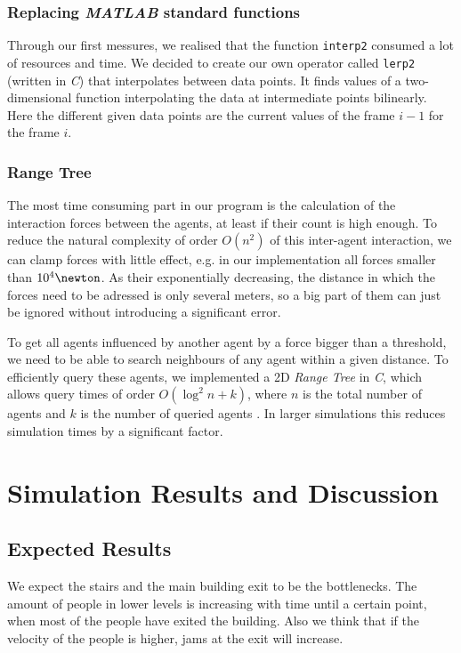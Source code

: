 \documentclass[11pt]{article}
\begin{document}
\subsubsection{Replacing \textit{MATLAB} standard functions}

Through our first messures, we realised that the function \verb+interp2+
consumed a lot of resources and time. We decided to create our own operator
called \verb+lerp2+ (written in \textit{C}) that interpolates between data points. It finds values of a
two-dimensional function interpolating the data at intermediate points bilinearly.
Here the different given data points are the current values of the frame $i-1$
for the frame $i$. 

\subsubsection{Range Tree}
The most time consuming part in our program is the calculation of the interaction
forces between the agents, at least if their count is high enough. To reduce the
natural complexity of order $O(n^{2})$ of this inter-agent interaction, we can clamp forces
with little effect, e.g. in our implementation all forces smaller than $ 10^{4}\newton$.
As their exponentially decreasing, the distance in which the forces need to be adressed
is only several meters, so a big part of them can just be ignored without introducing 
a significant error.

To get all agents influenced by another agent by a force bigger than a threshold, we need to be able
to search neighbours of any agent within a given distance. To efficiently query 
these agents, we implemented a 2D \textit{Range Tree} in \textit{C}, which allows query times
of order $O(\log^{2} n+k)$, where $n$ is the total number of agents and $k$ is the number of
queried agents \cite{algdat}. In larger simulations this reduces simulation times by a significant factor.

\section{Simulation Results and Discussion}

\subsection{Expected Results}

We expect the stairs and the main building exit to be the bottlenecks. The
amount of people in lower levels is increasing with time until a certain point,
when most of the people have exited the building. Also we think that if the 
velocity of the people is higher, jams at the exit will increase.
\end{document}
